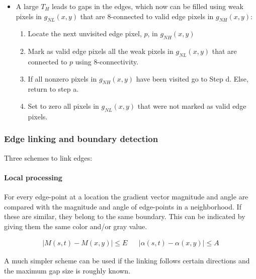 \begin{enumerate}
\begin{itemize}
			\item A large $T_H$ leads to gaps in the edges, which now can be filled using weak pixels in $g_{NL}(x,y)$ that are 8-connected to valid edge pixels in $g_{NH}(x,y)$:
				\begin{enumerate}
					\item Locate the next unvisited edge pixel, $p$, in $g_{NH}(x,y)$
					\item Mark as valid edge pixels all the weak pixels in $g_{NL}(x,y)$ that are connected to $p$ using 8-connectivity.
					\item If all nonzero pixels in $g_{NH}(x,y)$ have been visited go to Step d. Else, return to step a.
					\item Set to zero all pixels in $g_{NL}(x,y)$ that were not marked as valid edge pixels.
				\end{enumerate}
		\end{itemize}
\end{enumerate}


\subsubsection{Edge linking and boundary detection}
Three schemes to link edges:\\
\paragraph{Local processing}
For every edge-point at a location the gradient vector magnitude and angle are compared with the magnitude and angle of edge-points in a neighborhood. If these are similar, they belong to the same boundary. This can be indicated by giving them the same color and/or gray value.

\begin{align*}
	\left| M(s,t) - M(x,y) \right| \leq E && \left| \alpha(s,t) - \alpha(x,y) \right| \leq A
\end{align*}

A much simpler scheme can be used if the linking follows certain directions and the maximum gap size is roughly known.\\

